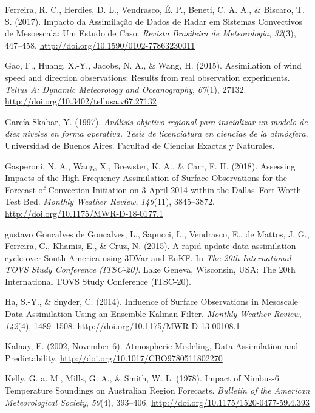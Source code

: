 \documentclass[12pt,twoside]{reedthesis}
\begin{document}
\leavevmode\hypertarget{ref-ferreira2017}{}%
Ferreira, R. C., Herdies, D. L., Vendrasco, É. P., Beneti, C. A. A., \& Biscaro, T. S. (2017). Impacto da Assimilação de Dados de Radar em Sistemas Convectivos de Mesoescala: Um Estudo de Caso. \emph{Revista Brasileira de Meteorologia}, \emph{32}(3), 447--458. \url{http://doi.org/10.1590/0102-77863230011}

\leavevmode\hypertarget{ref-gao2015}{}%
Gao, F., Huang, X.-Y., Jacobs, N. A., \& Wang, H. (2015). Assimilation of wind speed and direction observations: Results from real observation experiments. \emph{Tellus A: Dynamic Meteorology and Oceanography}, \emph{67}(1), 27132. \url{http://doi.org/10.3402/tellusa.v67.27132}

\leavevmode\hypertarget{ref-garciaskabar1997}{}%
García Skabar, Y. (1997). \emph{Análisis objetivo regional para inicializar un modelo de diez niveles en forma operativa. Tesis de licenciatura en ciencias de la atmósfera}. Universidad de Buenos Aires. Facultad de Ciencias Exactas y Naturales.

\leavevmode\hypertarget{ref-gasperoni2018}{}%
Gasperoni, N. A., Wang, X., Brewster, K. A., \& Carr, F. H. (2018). Assessing Impacts of the High-Frequency Assimilation of Surface Observations for the Forecast of Convection Initiation on 3 April 2014 within the Dallas--Fort Worth Test Bed. \emph{Monthly Weather Review}, \emph{146}(11), 3845--3872. \url{http://doi.org/10.1175/MWR-D-18-0177.1}

\leavevmode\hypertarget{ref-goncalvesdegoncalves2015}{}%
gustavo Goncalves de Goncalves, L., Sapucci, L., Vendrasco, E., de Mattos, J. G., Ferreira, C., Khamis, E., \& Cruz, N. (2015). A rapid update data assimilation cycle over South America using 3DVar and EnKF. In \emph{The 20th International TOVS Study Conference (ITSC-20)}. Lake Geneva, Wisconsin, USA: The 20th International TOVS Study Conference (ITSC-20).

\leavevmode\hypertarget{ref-ha2014}{}%
Ha, S.-Y., \& Snyder, C. (2014). Influence of Surface Observations in Mesoscale Data Assimilation Using an Ensemble Kalman Filter. \emph{Monthly Weather Review}, \emph{142}(4), 1489--1508. \url{http://doi.org/10.1175/MWR-D-13-00108.1}

\leavevmode\hypertarget{ref-kalnay2002}{}%
Kalnay, E. (2002, November 6). Atmospheric Modeling, Data Assimilation and Predictability. \url{http://doi.org/10.1017/CBO9780511802270}

\leavevmode\hypertarget{ref-kelly1978}{}%
Kelly, G. a. M., Mills, G. A., \& Smith, W. L. (1978). Impact of Nimbus-6 Temperature Soundings on Australian Region Forecasts. \emph{Bulletin of the American Meteorological Society}, \emph{59}(4), 393--406. \url{http://doi.org/10.1175/1520-0477-59.4.393}
\end{document}
